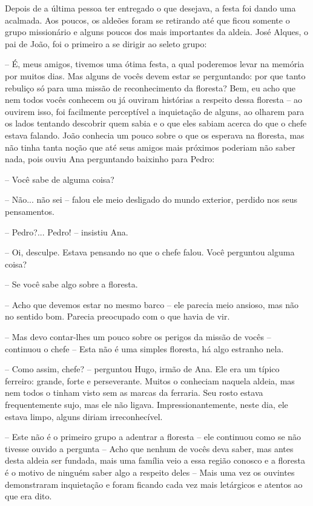 Depois de a última pessoa ter entregado o que desejava, a festa foi dando uma acalmada. Aos poucos, os aldeões foram se retirando até que ficou somente o grupo missionário e alguns poucos dos mais importantes da aldeia. José Alques, o pai de João, foi o primeiro a se dirigir ao seleto grupo:

-- É, meus amigos, tivemos uma ótima festa, a qual poderemos levar na memória por muitos dias. Mas alguns de vocês devem estar se perguntando: por que tanto rebuliço só para uma missão de reconhecimento da floresta? Bem, eu acho que nem todos vocês conhecem ou já ouviram histórias a respeito dessa floresta -- ao ouvirem isso, foi facilmente perceptível a inquietação de alguns, ao olharem para os lados tentando descobrir quem sabia e o que eles sabiam acerca do que o chefe estava falando. João conhecia um pouco sobre o que os esperava na floresta, mas não tinha tanta noção que até seus amigos mais próximos poderiam não saber nada, pois ouviu Ana perguntando baixinho para Pedro:

-- Você sabe de alguma coisa?

-- Não... não sei -- falou ele meio desligado do mundo exterior, perdido nos seus pensamentos.

-- Pedro?... Pedro! -- insistiu Ana.

-- Oi, desculpe. Estava pensando no que o chefe falou. Você perguntou alguma coisa?

-- Se você sabe algo sobre a floresta.

-- Acho que devemos estar no mesmo barco -- ele parecia meio ansioso, mas não no sentido bom. Parecia preocupado com o que havia de vir.

-- Mas devo contar-lhes um pouco sobre os perigos da missão de vocês -- continuou o chefe -- Esta não é uma simples floresta, há algo estranho nela.

-- Como assim, chefe? -- perguntou Hugo, irmão de Ana. Ele era um típico ferreiro: grande, forte e perseverante. Muitos o conheciam naquela aldeia, mas nem todos o tinham visto sem as marcas da ferraria. Seu rosto estava frequentemente sujo, mas ele não ligava. Impressionantemente, neste dia, ele estava limpo, alguns diriam irreconhecível.

-- Este não é o primeiro grupo a adentrar a floresta -- ele continuou como se não tivesse ouvido a pergunta -- Acho que nenhum de vocês deva saber, mas antes desta aldeia ser fundada, mais uma família veio a essa região conosco e a floresta é o motivo de ninguém saber algo a respeito deles -- Mais uma vez os ouvintes demonstraram inquietação e foram ficando cada vez mais letárgicos e atentos ao que era dito.

